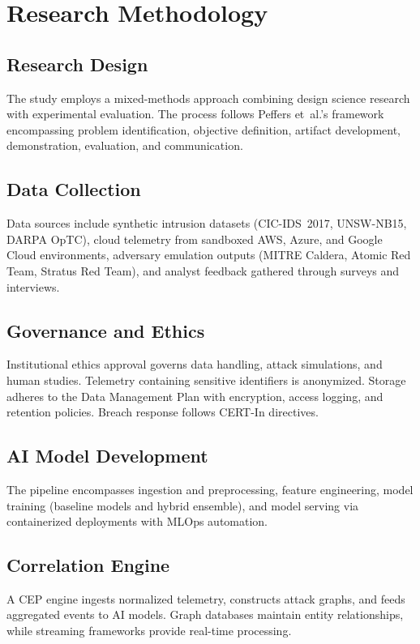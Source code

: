\chapter{Research Methodology}\label{chap:method}
\section{Research Design}
The study employs a mixed-methods approach combining design science research with experimental evaluation. The process follows Peffers et~al.'s framework encompassing problem identification, objective definition, artifact development, demonstration, evaluation, and communication.

\section{Data Collection}
Data sources include synthetic intrusion datasets (CIC-IDS~2017, UNSW-NB15, DARPA OpTC), cloud telemetry from sandboxed AWS, Azure, and Google Cloud environments, adversary emulation outputs (MITRE Caldera, Atomic Red Team, Stratus Red Team), and analyst feedback gathered through surveys and interviews.

\section{Governance and Ethics}
Institutional ethics approval governs data handling, attack simulations, and human studies. Telemetry containing sensitive identifiers is anonymized. Storage adheres to the Data Management Plan with encryption, access logging, and retention policies. Breach response follows CERT-In directives.

\section{AI Model Development}
The pipeline encompasses ingestion and preprocessing, feature engineering, model training (baseline models and hybrid ensemble), and model serving via containerized deployments with MLOps automation.

\section{Correlation Engine}
A CEP engine ingests normalized telemetry, constructs attack graphs, and feeds aggregated events to AI models. Graph databases maintain entity relationships, while streaming frameworks provide real-time processing.

